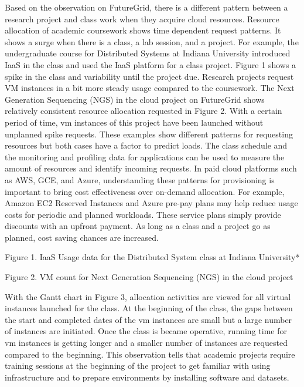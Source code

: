 \documentclass{sig-alternate}
\begin{document}
Based on the observation on FutureGrid, there is a different pattern between a research project and class work when they acquire cloud resources.  Resource allocation of academic coursework shows time dependent request patterns. It shows a surge when there is a class, a lab session, and a project. For example, the undergraduate course for Distributed Systems at Indiana University introduced IaaS in the class and used the IaaS platform for a class project. Figure 1 shows a spike in the class and variability until the project due. Research projects request VM instances in a bit more steady usage compared to the coursework. The Next Generation Sequencing (NGS) in the cloud project on FutureGrid shows relatively consistent resource allocation requested in Figure 2. With a certain period of time, vm instances of this project have been launched without unplanned spike requests. These examples show different patterns for requesting resources but both cases have a factor to predict loads. The class schedule and the monitoring and profiling data for applications can be used to measure the amount of resources and identify incoming requests. In paid cloud platforms such as AWS, GCE, and Azure, understanding these patterns for provisioning is important to bring cost effectiveness over on-demand allocation. For example, Amazon EC2 Reserved Instances and Azure pre-pay plans may help reduce usage costs for periodic and planned workloads. These service plans simply provide discounts with an upfront payment. As long as a class and a project go as planned, cost saving chances are increased. 

Figure 1. IaaS Usage data for the Distributed System class at Indiana University*


 
Figure 2. VM count for Next Generation Sequencing (NGS) in the cloud project

With the Gantt chart in Figure 3, allocation activities are viewed for all virtual instances launched for the class. At the beginning of the class, the gaps between the start and completed dates of the vm instances are small but a large number of instances are initiated. Once the class is became operative,  running time for vm instances is getting longer and a smaller number of instances are requested compared to the beginning. This observation tells that academic projects require training sessions at the beginning of the project to get familiar with using infrastructure and to prepare environments by installing software and datasets.
\end{document}
